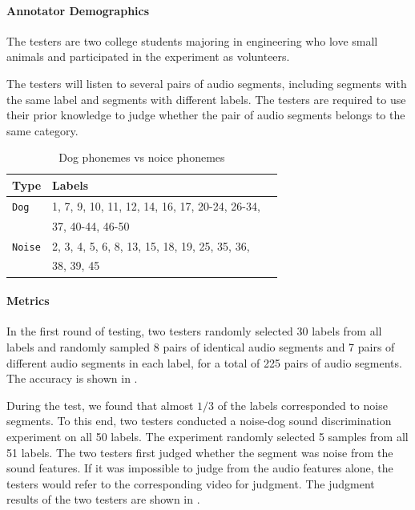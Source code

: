 \paragraph{Annotator Demographics}

The testers are two college students majoring in engineering who love small animals and participated in the experiment as volunteers.

The testers will listen to several pairs of audio segments, including segments with the same label and segments with different labels. The testers are required to use their prior knowledge to judge whether the pair of audio segments belongs to the same category.

\begin{table}
\centering
\small
\begin{tabular}{lll}
\hline
\textbf{Type} & \textbf{Labels}\\
\hline
\verb|Dog| & 1, 7, 9, 10, 11, 12, 14, 16, 17, 20-24, 26-34, \\
& 37, 40-44, 46-50 \\
\verb|Noise| & 2, 3, 4, 5, 6, 8, 13, 15, 18, 19, 25, 35, 36, \\
& 38, 39, 45 \\\hline
\end{tabular}
\caption{Dog phonemes vs noice phonemes}
\label{tab:phoneclassification}
\end{table}

\paragraph{Metrics}

In the first round of testing, two testers randomly selected 30 labels from all labels and randomly sampled 8 pairs of identical audio segments and 7 pairs of different audio segments in each label, for a total of 225 pairs of audio segments. The accuracy is shown in .

During the test, we found that almost $1/3$ of the labels corresponded to noise segments. To this end, two testers conducted a noise-dog sound discrimination experiment on all 50 labels. The experiment randomly selected 5 samples from all 51 labels. The two testers first judged whether the segment was noise from the sound features. If it was impossible to judge from the audio features alone, the testers would refer to the corresponding video for judgment. The judgment results of the two testers are shown in .


